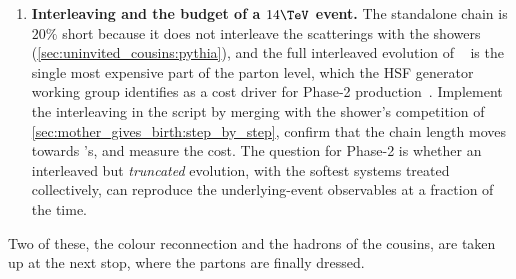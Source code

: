 \begin{enumerate}
    cone is correlated with the hard scattering's $b$ and therefore not
    uniform; this is the part no area subtraction can remove, and its
    size at $\pt=100\GeV$ decides whether a Phase-2 jet energy scale needs
    a separate underlying-event term.
  \item \textbf{Interleaving and the budget of a $14\TeV$ event.} The
    standalone chain is $20\%$ short because it does not interleave the
    scatterings with the showers (\cref{sec:uninvited_cousins:pythia}), and
    the full interleaved evolution of \PYTHIA~\cite{Sjostrand:2004ef} is the
    single most expensive part of the parton level, which the HSF generator
    working group identifies as a cost driver for Phase-2
    production~\cite{HSFPhysicsEventGeneratorWG:2020gxw}. Implement the
    interleaving in the script by merging  with the shower's
    competition of \cref{sec:mother_gives_birth:step_by_step}, confirm that
    the chain length moves towards \PYTHIA's, and measure the cost. The
    question for Phase-2 is whether an interleaved but \emph{truncated}
    evolution, with the softest systems treated collectively, can
    reproduce the underlying-event observables at a fraction of the time.
\end{enumerate}
Two of these, the colour reconnection and the hadrons of the cousins, are
taken up at the next stop, where the partons are finally dressed.
